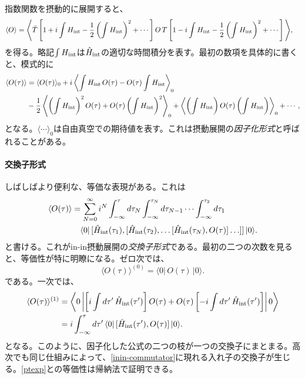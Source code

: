 \documentclass[a4paper,11pt,oneside]{article}
\theoremstyle{definition}
\numberwithin{equation}{section}
\begin{document}
指数関数を摂動的に展開すると、
\begin{align} \nonumber
\langle O \rangle
&=
\Bigg\langle
\bar T
\left[
1+i\int H_{\rm int}
-\frac12\left(\int H_{\rm int}\right)^2+\cdots
\right]
O \,
T
\left[
1-i\int H_{\rm int}
-\frac12\left(\int H_{\rm int}\right)^2+\cdots
\right]
\Bigg\rangle ,
\end{align}
を得る。略記\(\int H_{\rm int}\)は\(\hat H_{\rm int}\)の適切な時間積分を表す。最初の数項を具体的に書くと、模式的に
\begin{align}\label{ptexp}
\langle O(\tau)\rangle
&=
\langle O(\tau)\rangle_0
+i\left\langle \int H_{\rm int}\, O(\tau)-O(\tau)\int H_{\rm int}\right\rangle_0
\\ \nonumber
&
-\frac12\left\langle
\left(\int H_{\rm int}\right)^2 O(\tau)
+O(\tau)\left(\int H_{\rm int}\right)^2
\right\rangle_0
+\left\langle
\left(\int H_{\rm int}\right) O(\tau)\left(\int H_{\rm int}\right)
\right\rangle_0
+\cdots ,
\end{align}
となる。\(\langle \cdots \rangle_0\)は自由真空での期待値を表す。これは摂動展開の\textit{因子化形式}と呼ばれることがある。





\paragraph{交換子形式} しばしばより便利な、等価な表現がある。これは
\begin{align}\label{inin-commutator}
\langle O(\tau)\rangle
&=
\sum_{N=0}^{\infty}
i^N
\int_{-\infty}^{\tau} d\tau_N
\int_{-\infty}^{\tau_N} d\tau_{N-1}
\cdots
\int_{-\infty}^{\tau_2} d\tau_1\\ 
& \quad \langle 0|\,
[\hat H_{\rm int}(\tau_1),
[\hat H_{\rm int}(\tau_2),
\ldots
[\hat H_{\rm int}(\tau_N),O(\tau)]
\ldots
]]
\,|0\rangle . \nonumber
\end{align}
と書ける。これがin-in摂動展開の\textit{交換子形式}である。最初の二つの次数を見ると、等価性が特に明瞭になる。ゼロ次では、
\begin{equation}\label{commutatorform}
\langle O(\tau)\rangle^{(0)}=\langle 0|\,O(\tau)\,|0\rangle .
\end{equation}
である。一次では、
\begin{align}
\langle O(\tau)\rangle^{(1)}
&=
\left\langle 0\left|
\left[i\int d\tau' \,\hat H_{\rm int}(\tau')\right] O(\tau)
+
O(\tau)
\left[-i\int d\tau' \,\hat H_{\rm int}(\tau')\right]
\right|0\right\rangle
\nonumber\\
&=
i\int_{-\infty}^{\tau} d\tau' \,
\langle 0|\, [\hat H_{\rm int}(\tau'),O(\tau)] \,|0\rangle .
\end{align}
となる。このように、因子化した公式の二つの枝が一つの交換子にまとまる。高次でも同じ仕組みによって、\eqref{inin-commutator}に現れる入れ子の交換子が生じる。\eqref{ptexp}との等価性は帰納法で証明できる\cite{Weinberg:2005vy}。
\end{document}
